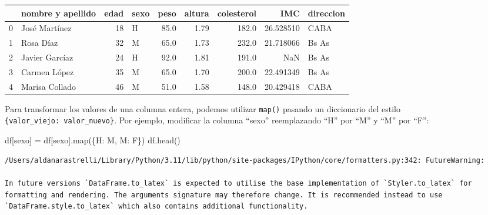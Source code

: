 \documentclass[
  letterpaper,
  DIV=11,
  numbers=noendperiod]{scrreprt}
\newenvironment{Shaded}{\begin{snugshade}}{\end{snugshade}}
\newcommand{\BuiltInTok}[1]{\textcolor[rgb]{0.00,0.23,0.31}{#1}}
\newcommand{\NormalTok}[1]{\textcolor[rgb]{0.00,0.23,0.31}{#1}}
\newcommand{\OperatorTok}[1]{\textcolor[rgb]{0.37,0.37,0.37}{#1}}
\newcommand{\StringTok}[1]{\textcolor[rgb]{0.13,0.47,0.30}{#1}}
\begin{document}
\begin{tabular}{llrlrrrrl}
\toprule
{} & nombre y apellido &  edad & sexo &  peso &  altura &  colesterol &        IMC & direccion \\
\midrule
0 &     José Martínez &    18 &    H &  85.0 &    1.79 &       182.0 &  26.528510 &      CABA \\
1 &         Rosa Díaz &    32 &    M &  65.0 &    1.73 &       232.0 &  21.718066 &     Bs As \\
2 &    Javier Garcíaz &    24 &    H &  92.0 &    1.81 &       191.0 &        NaN &     Bs As \\
3 &      Carmen López &    35 &    M &  65.0 &    1.70 &       200.0 &  22.491349 &     Bs As \\
4 &    Marisa Collado &    46 &    M &  51.0 &    1.58 &       148.0 &  20.429418 &      CABA \\
\bottomrule
\end{tabular}

Para transformar los valores de una columna entera, podemos utilizar
\texttt{map()} pasando un diccionario del estilo
\texttt{\{valor\_viejo:\ valor\_nuevo\}}. Por ejemplo, modificar la
columna ``sexo'' reemplazando ``H'' por ``M'' y ``M'' por ``F'':

\begin{Shaded}
\begin{Highlighting}[]
\NormalTok{df[}\StringTok{\textquotesingle{}sexo\textquotesingle{}}\NormalTok{] }\OperatorTok{=}\NormalTok{ df[}\StringTok{\textquotesingle{}sexo\textquotesingle{}}\NormalTok{].}\BuiltInTok{map}\NormalTok{(\{}\StringTok{\textquotesingle{}H\textquotesingle{}}\NormalTok{: }\StringTok{\textquotesingle{}M\textquotesingle{}}\NormalTok{, }\StringTok{\textquotesingle{}M\textquotesingle{}}\NormalTok{: }\StringTok{\textquotesingle{}F\textquotesingle{}}\NormalTok{\})}
\NormalTok{df.head()}
\end{Highlighting}
\end{Shaded}

\begin{verbatim}
/Users/aldanarastrelli/Library/Python/3.11/lib/python/site-packages/IPython/core/formatters.py:342: FutureWarning:

In future versions `DataFrame.to_latex` is expected to utilise the base implementation of `Styler.to_latex` for formatting and rendering. The arguments signature may therefore change. It is recommended instead to use `DataFrame.style.to_latex` which also contains additional functionality.
\end{verbatim}
\end{document}
